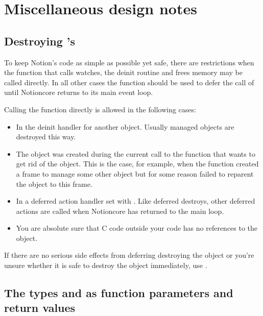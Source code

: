 \section{Miscellaneous design notes}

\subsection{Destroying 's}

To keep Notion's code as simple as possible yet safe, there are restrictions
when the 
function that calls watches, the deinit routine and frees memory may
be called directly. In all other cases the %
function should be used to defer the call of  until
Notioncore returns to its main event loop. 

Calling the  function directly is allowed in the
following cases:
\begin{itemize}
    \item In the deinit handler for another object. Usually managed objects
      are destroyed this way.
    \item The object was created during the current call to the function
      that wants to get rid of the object. This is the case, for example,
      when the function created a frame to manage some other object but for
      some reason failed to reparent the object to this frame.
    \item In a deferred action handler set with %
      .
      Like deferred destroys, other deferred actions are called when
      Notioncore has returned to the main loop.
    \item You are absolute sure that C code outside your code has no
      references to the object.
\end{itemize}

If there are no serious side effects from deferring destroying the
object or you're unsure whether it is safe to destroy the object
immediately, use .

\subsection{The types  and  as function
  parameters and return values}


